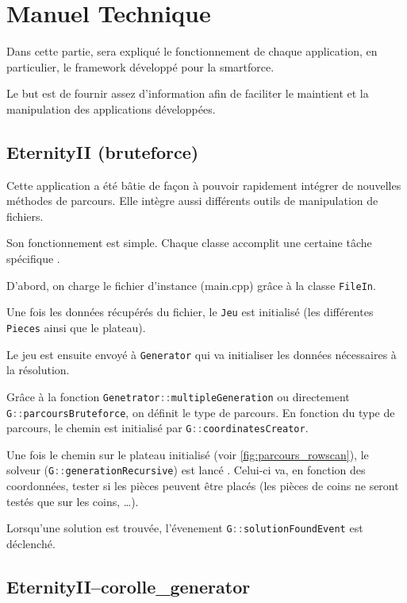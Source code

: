 \section{Manuel Technique}

Dans cette partie, sera expliqué le fonctionnement de chaque application, en particulier, le framework développé pour la smartforce.

Le but est de fournir assez d'information afin de faciliter le maintient et la manipulation des applications développées.

	\subsection{EternityII (bruteforce)}
	
Cette application a été bâtie de façon à pouvoir rapidement intégrer de nouvelles méthodes de parcours. Elle intègre aussi différents outils de manipulation de fichiers.

Son fonctionnement est simple. Chaque classe accomplit une certaine tâche spécifique \autocite{wiki:kissprinciple}.

D'abord, on charge le fichier d'instance (main.cpp) grâce à la classe \lstinline[language=c++]|FileIn|. 

Une fois les données récupérés du fichier, le \lstinline[language=c++]|Jeu| est initialisé (les différentes \lstinline[language=c++]|Pieces| ainsi que le plateau).

Le jeu est ensuite envoyé à \lstinline[language=c++]|Generator| qui va initialiser les données nécessaires à la résolution. 

Grâce à la fonction  \lstinline[language=c++]|Genetrator::multipleGeneration| ou directement  \lstinline[language=c++]|G::parcoursBruteforce|, on définit le type de parcours. En fonction du type de parcours, le chemin est initialisé par  \lstinline[language=c++]|G::coordinatesCreator|. 

Une fois le chemin sur le plateau initialisé (voir \autoref{fig:parcours_rowscan}), le solveur (\lstinline[language=c++]|G::generationRecursive|) est lancé . Celui-ci va, en fonction des coordonnées, tester si les pièces peuvent être placés (les pièces de coins ne seront testés que sur les coins, \dots). 

Lorsqu'une solution est trouvée, l'évenement \lstinline[language=c++]|G::solutionFoundEvent| est déclenché. 

	\subsection{EternityII--corolle\_generator}
	
